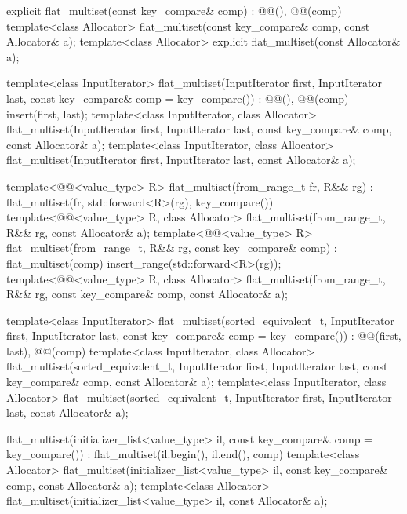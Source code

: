 \begin{codeblock}
{{    explicit flat_multiset(const key_compare& comp)
      : @@(), @@(comp) { }
    template<class Allocator>
      flat_multiset(const key_compare& comp, const Allocator& a);
    template<class Allocator>
      explicit flat_multiset(const Allocator& a);

    template<class InputIterator>
      flat_multiset(InputIterator first, InputIterator last,
                    const key_compare& comp = key_compare())
        : @@(), @@(comp)
        { insert(first, last); }
    template<class InputIterator, class Allocator>
      flat_multiset(InputIterator first, InputIterator last,
                    const key_compare& comp, const Allocator& a);
    template<class InputIterator, class Allocator>
      flat_multiset(InputIterator first, InputIterator last, const Allocator& a);

    template<@@<value_type> R>
      flat_multiset(from_range_t fr, R&& rg)
        : flat_multiset(fr, std::forward<R>(rg), key_compare()) { }
    template<@@<value_type> R, class Allocator>
      flat_multiset(from_range_t, R&& rg, const Allocator& a);
    template<@@<value_type> R>
      flat_multiset(from_range_t, R&& rg, const key_compare& comp)
        : flat_multiset(comp)
        { insert_range(std::forward<R>(rg)); }
    template<@@<value_type> R, class Allocator>
      flat_multiset(from_range_t, R&& rg, const key_compare& comp, const Allocator& a);

    template<class InputIterator>
      flat_multiset(sorted_equivalent_t, InputIterator first, InputIterator last,
                    const key_compare& comp = key_compare())
        : @@(first, last), @@(comp) { }
    template<class InputIterator, class Allocator>
      flat_multiset(sorted_equivalent_t, InputIterator first, InputIterator last,
                    const key_compare& comp, const Allocator& a);
    template<class InputIterator, class Allocator>
      flat_multiset(sorted_equivalent_t, InputIterator first, InputIterator last,
                    const Allocator& a);

    flat_multiset(initializer_list<value_type> il, const key_compare& comp = key_compare())
      : flat_multiset(il.begin(), il.end(), comp) { }
    template<class Allocator>
      flat_multiset(initializer_list<value_type> il, const key_compare& comp,
                    const Allocator& a);
    template<class Allocator>
      flat_multiset(initializer_list<value_type> il, const Allocator& a);

}}
\end{codeblock}
